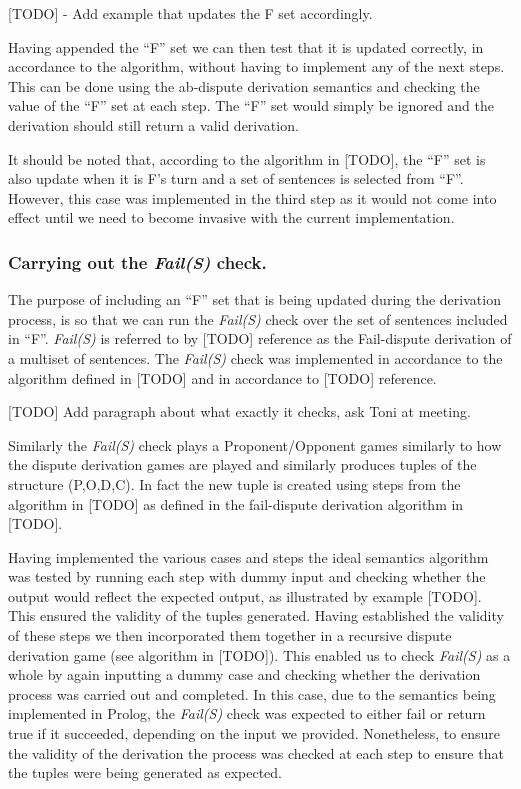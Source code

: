 [TODO] - Add example that updates the F set accordingly.

Having appended the ``F'' set we can then test that it is updated correctly, in accordance to the algorithm, without having to implement any of the next steps. This can be done using the ab-dispute derivation semantics and checking the value of the ``F'' set at each step. The ``F'' set would simply be ignored and the derivation should still return a valid derivation.

It should be noted that, according to the algorithm in [TODO], the ``F'' set is also update when it is F's turn and a set of sentences is selected from ``F''. However, this case was implemented in the third step as it would not come into effect until we need to become invasive with the current implementation.

\subsubsection{Carrying out the \emph{Fail(S)} check.}

The purpose of including an ``F'' set that is being updated during the derivation process, is so that we can run the \emph{Fail(S)} check over the set of sentences included in ``F''. \emph{Fail(S)} is referred to by [TODO] reference as the Fail-dispute derivation of a multiset of sentences. The \emph{Fail(S)} check was implemented in accordance to the algorithm defined in [TODO] and in accordance to [TODO] reference.

[TODO] Add paragraph about what exactly it checks, ask Toni at meeting.

Similarly the \emph{Fail(S)} check plays a Proponent/Opponent games similarly to how the dispute derivation games are played and similarly produces tuples of the structure (P,O,D,C). In fact the new tuple is created using steps from the algorithm in [TODO] as defined in the fail-dispute derivation algorithm in [TODO].

Having implemented the various cases and steps the ideal semantics algorithm was tested by running each step with dummy input and checking whether the output would reflect the expected output, as illustrated by example [TODO]. This ensured the validity of the tuples generated. Having established the validity of these steps we then incorporated them together in a recursive dispute derivation game (see algorithm in [TODO]). This enabled us to check \emph{Fail(S)} as a whole by again inputting a dummy case and checking whether the derivation process was carried out and completed. In this case, due to the semantics being implemented in Prolog, the \emph{Fail(S)} check was expected to either fail or return true if it succeeded, depending on the input we provided. Nonetheless, to ensure the validity of the derivation the process was checked at each step to ensure that the tuples were being generated as expected.


